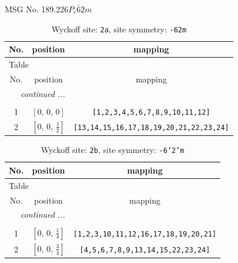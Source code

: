 \documentclass[fleqn,8pt]{jsarticle}
\begin{document}
\setcounter{MaxMatrixCols}{32}

\renewcommand{\tablename}{Table~}
\renewcommand{\figurename}{Figure~}
\begin{center}
\LARGE
MSG No. 189.226\quad$P_{c}\bar{6}2m$
\end{center}
\renewcommand{\arraystretch}{1.2}
\begin{longtable}{ccc}
\caption{Wyckoff site: {\tt 2a}, site symmetry: {\tt -62m}}
 \\
 \hline \hline
No. & position & mapping \\ \hline \endfirsthead

\multicolumn{2}{l}{\tablename\ \thetable{}} \\
 \hline \hline
No. & position & mapping \\ \hline \endhead

 \hline \hline
\multicolumn{2}{r}{\footnotesize\it continued ...} \\ \endfoot

 \hline \hline
\multicolumn{2}{r}{} \\ \endlastfoot

1 & $\left[ 0,\, 0,\, 0 \right]$ & {\tt [1,2,3,4,5,6,7,8,9,10,11,12]} \\ \hline
2 & $\left[ 0,\, 0,\, \frac{1}{2} \right]$ & {\tt [13,14,15,16,17,18,19,20,21,22,23,24]} \\
\end{longtable}
\renewcommand{\arraystretch}{1.2}
\begin{longtable}{ccc}
\caption{Wyckoff site: {\tt 2b}, site symmetry: {\tt -6'2'm}}
 \\
 \hline \hline
No. & position & mapping \\ \hline \endfirsthead

\multicolumn{2}{l}{\tablename\ \thetable{}} \\
 \hline \hline
No. & position & mapping \\ \hline \endhead

 \hline \hline
\multicolumn{2}{r}{\footnotesize\it continued ...} \\ \endfoot

 \hline \hline
\multicolumn{2}{r}{} \\ \endlastfoot

1 & $\left[ 0,\, 0,\, \frac{1}{4} \right]$ & {\tt [1,2,3,10,11,12,16,17,18,19,20,21]} \\ \hline
2 & $\left[ 0,\, 0,\, \frac{3}{4} \right]$ & {\tt [4,5,6,7,8,9,13,14,15,22,23,24]} \\
\end{longtable}
\end{document}
